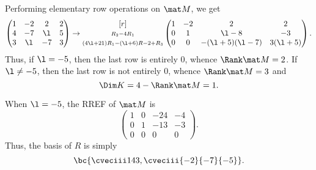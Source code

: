 \begin{solution}
    \begin{ppart}
        Performing elementary row operations on $\mat M$, we get \[\begin{pmatrix}1 & -2 & 2 & 2 \\ 4 & -7 & \l & 5 \\ 3 & \l & -7 & 3\end{pmatrix} \rightarrow \begin{matrix}[r] \\ \scriptstyle R_2 - 4R_1 \\ \scriptstyle (4\l+21)R_1 - (\l+6)R-2 + R_3\end{matrix}\begin{pmatrix}1 & -2 & 2 & 2 \\ 0 & 1 & \l-8 & - 3 \\ 0 & 0 & -(\l+5)(\l-7) & 3(\l + 5)\end{pmatrix}.\] Thus, if $\l = -5$, then the last row is entirely 0, whence $\Rank \mat M = 2$. If $\l \neq -5$, then the last row is not entirely 0, whence $\Rank \mat M = 3$ and \[\Dim K = 4 - \Rank \mat M = 1.\]
    \end{ppart}
    \begin{ppart}
        When $\l = -5$, the RREF of $\mat M$ is \[\begin{pmatrix}1 & 0 & -24 & -4 \\ 0 & 1 & -13 & -3 \\ 0 & 0 & 0 & 0\end{pmatrix}.\] Thus, the basis of $R$ is simply \[\bc{\cveciii143, \cveciii{-2}{-7}{-5}}.\]


\end{ppart}
\end{solution}
